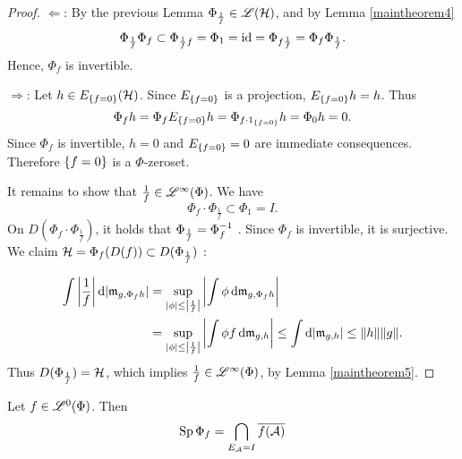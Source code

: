 \begin{proof}
 $\Leftarrow$: 
 By the previous Lemma $\Phi_\frac{1}{f} \in \mathscr{L}(\mathcal{H})$, and by Lemma 
 \ref{maintheorem4}
 \[
 \Phi_\frac{1}{f} \Phi_f \subset \Phi_{\frac{1}{f} f} = \Phi_1 = \operatorname{id} =
 \Phi_{f \frac{1}{f}} = \Phi_f \Phi_\frac{1}{f}.
 \]
Hence, $\Phi_f$ is invertible.

$\Rightarrow$:
Let $h \in E_{\left\lbrace f = 0\right\rbrace}(\mathcal{H})$. Since $E_{\left\lbrace f = 0\right\rbrace}$ is a
projection, $E_{\left\lbrace f = 0\right\rbrace} h = h$. Thus
\[
  \Phi_f h = \Phi_f E_{\left\lbrace f = 0\right\rbrace} h = \Phi_{f \cdot 
    1_{\left\lbrace f = 0\right\rbrace}} h = \Phi_0 h = 0.
\]
Since $\Phi_f $ is invertible, $h =0$ and $E_{\left\lbrace f = 0\right\rbrace} =0$ are
immediate consequences. Therefore $\left\lbrace f = 0\right\rbrace$ is a $\Phi$-zeroset. 

It remains to show that $ \frac{1}{f} \in \mathscr{L}^\infty (\Phi)$. We have
\[
 \Phi_f \cdot \Phi_\frac{1}{f} \subset \Phi_1 = I.
\]
On $D(\Phi_f \cdot \Phi_\frac{1}{f}) $, it holds that $\Phi_\frac{1}{f}
= \Phi_f ^{-1}$ .
Since $\Phi_f$ is invertible, it is surjective. We claim $ \mathcal{H} = \Phi_f(D(f))
\subset D(\Phi_\frac{1}{f})$ :

\begin{align*}
  \int \left| \frac{1}{f} \right | \text{d}|\mathfrak{m}_{g,\Phi_f h}| &= \sup_{| \phi |
    \leq \left | \frac{1}{f} \right| } \left | \int \phi \operatorname{d}\! \mathfrak{m}_{g,\Phi_f h}
  \right| \\&= \sup_{| \phi | \leq \left| \frac{1}{f} \right |}
  \left| \int \phi f \operatorname{d}\! \mathfrak{m}_{g,h} \right| \leq \int \text{d}|\mathfrak{m}_{g,h}| \leq
  \| h \| \|g\|.
\end{align*}
Thus $D(\Phi_\frac{1}{f}) = \mathcal{H}$, which implies $\frac{1}{f} \in \mathscr{L}^\infty (\Phi)$,
by Lemma \ref{maintheorem5}.
\end{proof}

\begin{lem} \label{maintheorem7}
 Let $f \in \mathscr{L}^0(\Phi)$. Then 
 \[
 \operatorname{Sp} \Phi_f = \bigcap_{E_\mathcal{A} = I} \overline{f(\mathcal{A})}
 \]

\end{lem}

